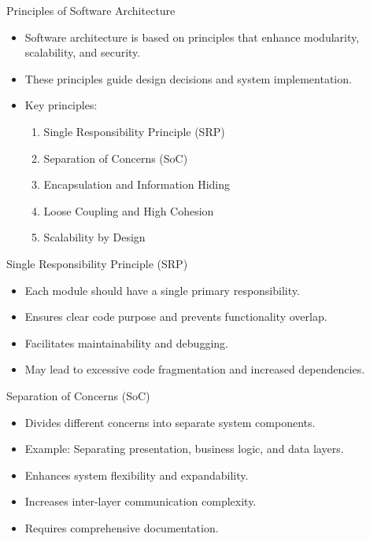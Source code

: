 \documentclass[aspectratio=169, table]{beamer}
\begin{document}
	\begin{frame}{Principles of Software Architecture}
		\begin{itemize}
			\item Software architecture is based on principles that enhance modularity, scalability, and security.
			\item These principles guide design decisions and system implementation.
			\item Key principles:
			\begin{enumerate}
				\item Single Responsibility Principle (SRP)
				\item Separation of Concerns (SoC)
				\item Encapsulation and Information Hiding
				\item Loose Coupling and High Cohesion
				\item Scalability by Design
			\end{enumerate}
		\end{itemize}
	\end{frame}
	
	\begin{frame}{Single Responsibility Principle (SRP)}
		\begin{itemize}
			\item Each module should have a single primary responsibility.
			\item Ensures clear code purpose and prevents functionality overlap.
			\item Facilitates maintainability and debugging.
			\item May lead to excessive code fragmentation and increased dependencies.
		\end{itemize}
	\end{frame}
	
	\begin{frame}{Separation of Concerns (SoC)}
		\begin{itemize}
			\item Divides different concerns into separate system components.
			\item Example: Separating presentation, business logic, and data layers.
			\item Enhances system flexibility and expandability.
			\item Increases inter-layer communication complexity.
			\item Requires comprehensive documentation.
		\end{itemize}
	\end{frame}
	
\end{document}
